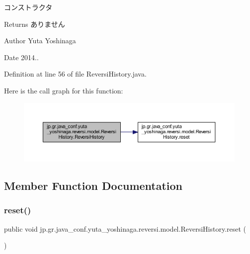 コンストラクタ 

\begin{DoxyReturn}{Returns}
ありません 
\end{DoxyReturn}
\begin{DoxyAuthor}{Author}
Yuta Yoshinaga 
\end{DoxyAuthor}
\begin{DoxyDate}{Date}
2014.. 
\end{DoxyDate}


Definition at line 56 of file Reversi\+History.\+java.

Here is the call graph for this function\+:\nopagebreak
\begin{figure}[H]
\begin{center}
\leavevmode
\includegraphics[width=350pt]{classjp_1_1gr_1_1java__conf_1_1yuta__yoshinaga_1_1reversi_1_1model_1_1_reversi_history_abd0f556489e10b58555304449c6c2682_cgraph}
\end{center}
\end{figure}


\subsection{Member Function Documentation}
\mbox{\label{classjp_1_1gr_1_1java__conf_1_1yuta__yoshinaga_1_1reversi_1_1model_1_1_reversi_history_aee0155159a017671c2b18c1d8229d8d1}} 
\subsubsection{\texorpdfstring{reset()}{reset()}}
{\footnotesize\ttfamily public void jp.\+gr.\+java\+\_\+conf.\+yuta\+\_\+yoshinaga.\+reversi.\+model.\+Reversi\+History.\+reset (\begin{DoxyParamCaption}{ }\end{DoxyParamCaption})}



